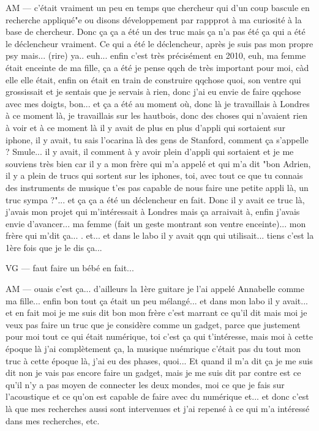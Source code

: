 AM — c'était vraiment un peu en temps que chercheur qui d'un coup bascule en recherche appliqué"e ou disons développement par rappprot à ma curiosité à la base de chercheur. Donc ça ça a été un des truc mais ça n'a pas été ça qui a été le déclencheur vraiment.
Ce qui a été le déclencheur, après je suis pas mon propre psy mais... (rire) ya.. euh... enfin c'est très précisément en 2010, euh, ma femme était enceinte de ma fille, ça a été  je pense  qqch de très important pour moi, càd elle elle était, enfin on était en train de construire qqchose quoi, son ventre qui grossissait et je sentais que je servais à rien, donc j'ai eu envie de faire qqchose avec mes doigts, bon... 
et ça a été au moment où, donc là je travaillais à Londres à ce moment là, je travaillais sur les hautbois, donc des choses qui n'avaient rien à voir et à ce moment là il y avait de plus en plus d'appli qui sortaient sur iphone, il y avait, tu sais l'ocarina là des gens de Stanford, comment ça s'appelle ? Smule... il y avait, il comment à y avoir plein d'appli qui sortaient et je me souviens très bien car il y a mon frère qui m'a appelé et qui m'a dit "bon Adrien, il y a plein de trucs qui sortent sur les iphones, toi, avec tout ce que tu connais des instruments de musique t'es pas capable de nous faire une petite appli là, un truc sympa ?"... et ça ça a été un déclencheur en fait.
Donc il y avait ce truc là, j'avais mon projet qui m'intéressait à Londres mais ça arraivait à, enfin j'avais envie d'avancer... ma femme (fait un geste montrant son ventre enceinte)... mon frère qui m'dit ça... . et... et dans le labo il y avait qqn qui utilisait... tiens c'est la 1ère fois que je le dis ça... 

VG — faut faire un bébé en fait... 

AM — ouais c'est ça... d'ailleurs la 1ère guitare je l'ai appelé Annabelle comme ma fille... enfin bon tout ça était un peu mélangé... 
et dans mon labo il y avait... et en fait moi je me suis dit bon mon frère c'est marrant ce qu'il dit mais moi je veux pas faire un truc que je considère comme un gadget, parce que justement pour moi tout ce qui était numérique, toi c'est ça qui t'intéresse, mais moi à cette époque là j'ai complètement ça, la musique nuémrique c'était pas du  tout mon truc à cette époque là, j'ai eu des phases, quoi... Et quand il m'a dit ça je me suis dit non je vais pas encore faire un gadget,  mais je me suis dit par contre est ce qu'il n'y a pas moyen de connecter les deux mondes, moi ce que je fais sur l'acoustique et ce qu'on est capable de faire avec du numérique et... et donc c'est là que mes recherches aussi sont intervenues et j'ai repensé à ce qui m'a intéressé dans mes recherches, etc.


